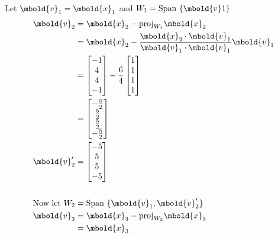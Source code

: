 \documentclass[12pt letter]{report}
\begin{document}
{  \noindent Let $\mbold{v}_1 = \mbold{x}_1$ and $W_1 = \text{Span } \{\mbold{v}1\} $
  \begin{align*}
    \mbold{v}_2          & = \mbold{x}_2 - \text{proj}_{W_1}\mbold{x}_2                                                                        \\
                         & = \mbold{x}_2 - \frac{\mbold{x}_2 \cdot \mbold{v}_1}{\mbold{v}_1 \cdot \mbold{v}_1}\mbold{v}_1                      \\
                         & = \begin{bmatrix} -1 \\ 4 \\ 4 \\ -1 \end{bmatrix} - \frac{6}{4} \begin{bmatrix} 1 \\ 1\\ 1\\ 1 \end{bmatrix}       \\
                         & = \begin{bmatrix}
                               -\frac{5}{2} \\
                               \frac{5}{2}  \\
                               \frac{5}{2}  \\
                               -\frac{5}{2} \\
                             \end{bmatrix}                                                                                                    \\
    \mbold{v}^{\prime}_2 & = \begin{bmatrix} -5 \\ 5\\ 5\\ -5 \end{bmatrix}                                                                    \\
    \\
    \text{Now let } W_2  & = \text{Span } \{\mbold{v}_1, \mbold{v}^{\prime}_2\}                                                                \\
    \mbold{v}_3          & = \mbold{x}_3 - \text{proj}_{W_2} \mbold{x}_3                                                                       \\
                         & = \mbold{x}_3

\end{align*}}
\end{document}
